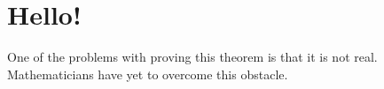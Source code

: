\documentclass[12pt]{article}
\begin{document}
    \section*{Hello!}

    \begin{tcolorbox}[
        colback=cyan!15!white,
        colframe=cyan!70!black,
        adjusted title=$x^{2+\zeta(s)}$ \textbf{as a generator},
        left=0.5in,
        right=0.5in]

        One of the problems with proving this theorem is that it is not real. Mathematicians have yet to overcome this obstacle.
    \end{tcolorbox}
\end{document}
